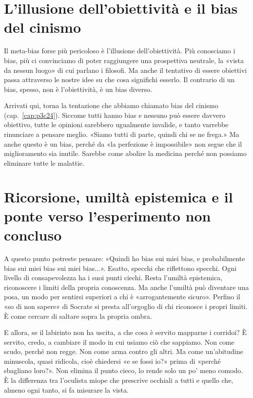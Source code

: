 \section{L'illusione dell'obiettività e il bias del cinismo}
\label{sec:p4c25-obiettivita}

Il meta-bias forse più pericoloso è l'illusione dell'obiettività. Più conosciamo i bias, più ci convinciamo di poter raggiungere una prospettiva neutrale, la «vista da nessun luogo» di cui parlano i filosofi. Ma anche il tentativo di essere obiettivi passa attraverso le nostre idee su che cosa significhi esserlo. Il contrario di un bias, spesso, non è l'obiettività, è un bias diverso.

Arrivati qui, torna la tentazione che abbiamo chiamato bias del cinismo (cap.~\ref{cap:p3c24}). Siccome tutti hanno bias e nessuno può essere davvero obiettivo, tutte le opinioni sarebbero ugualmente invalide, e tanto varrebbe rinunciare a pensare meglio. «Siamo tutti di parte, quindi chi se ne frega.» Ma anche questo è un bias, perché da «la perfezione è impossibile» non segue che il miglioramento sia inutile. Sarebbe come abolire la medicina perché non possiamo eliminare tutte le malattie.

\section{Ricorsione, umiltà epistemica e il ponte verso l'esperimento non concluso}
\label{sec:p4c25-recursione}

A questo punto potreste pensare: «Quindi ho bias sui miei bias, e probabilmente bias sui miei bias sui miei bias...». Esatto, specchi che riflettono specchi. Ogni livello di consapevolezza ha i suoi punti ciechi. Resta l'umiltà epistemica, riconoscere i limiti della propria conoscenza. Ma anche l'umiltà può diventare una posa, un modo per sentirsi superiori a chi è «arrogantemente sicuro». Perfino il «so di non sapere» di Socrate si presta all'orgoglio di chi riconosce i propri limiti. È come cercare di saltare sopra la propria ombra.

E allora, se il labirinto non ha uscita, a che cosa è servito mapparne i corridoi? È servito, credo, a cambiare il modo in cui usiamo ciò che sappiamo. Non come scudo, perché non regge. Non come arma contro gli altri. Ma come un'abitudine minuscola, quasi ridicola, cioè chiedersi «e se fossi io?» prima di «perché sbagliano loro?». Non elimina il punto cieco, lo rende solo un po' meno comodo. È la differenza tra l'oculista miope che prescrive occhiali a tutti e quello che, almeno ogni tanto, si fa misurare la vista.

